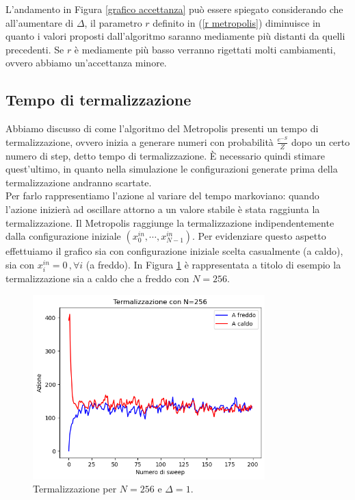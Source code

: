 \documentclass{article}
\begin{document}
L'andamento in Figura \ref{grafico accettanza} può essere spiegato considerando che all'aumentare di $\Delta$, il parametro $r$ definito in (\ref{r metropolis}) diminuisce in quanto i valori proposti dall'algoritmo saranno mediamente più distanti da quelli precedenti. Se $r$ è mediamente più basso verranno rigettati molti cambiamenti, ovvero abbiamo un'accettanza minore. 










\subsection{Tempo di termalizzazione}

Abbiamo discusso di come l'algoritmo del Metropolis presenti un tempo di termalizzazione, ovvero inizia a generare numeri con probabilità $\frac{e^{-S}}{Z}$ dopo un certo numero di step, detto tempo di termalizzazione. È necessario quindi stimare quest'ultimo, in quanto nella simulazione le configurazioni generate prima della termalizzazione andranno scartate. \\
Per farlo rappresentiamo l'azione al variare del tempo markoviano: quando l'azione inizierà ad oscillare attorno a un valore stabile è stata raggiunta la termalizzazione. Il Metropolis raggiunge la termalizzazione indipendentemente dalla configurazione iniziale $(x_0^{in},\cdots, x_{N-1}^{in})$. Per evidenziare questo aspetto effettuiamo il grafico sia con configurazione iniziale scelta casualmente (a caldo), sia con $x_i^{in}=0\,,\forall i$ (a freddo). In Figura \ref{grafico termalizzazione} è rappresentata a titolo di esempio la termalizzazione sia a caldo che a freddo con $N=256$. 
\begin{figure}[h]
    \centering
    \includegraphics[width=0.8\textwidth]{images/thermalisation_N256.png}
    \caption{Termalizzazione per $N=256$ e $\Delta=1$.}
    \label{grafico termalizzazione}
\end{figure}
\end{document}
